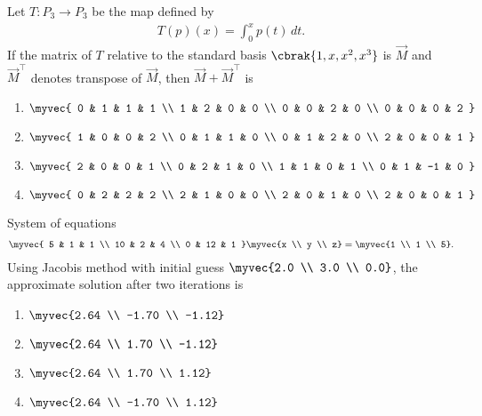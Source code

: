 \item
Let $T: P_3 \to P_3$ be the map defined by
\begin{align*}
    T(p)(x) = \int_0^x p(t) \, dt.
\end{align*}
If the matrix of $T$ relative to the standard basis $\cbrak{1, x, x^2, x^3}$ is $\vec{M}$ and $\vec{M}^{\top}$ denotes transpose of $\vec{M}$, then $\vec{M} + \vec{M}^{\top}$ is
\hfill{}
\begin{multicols}{4}
\begin{enumerate}
\item $\myvec{
0 & 1 & 1 & 1 \\
1 & 2 & 0 & 0 \\
0 & 0 & 2 & 0 \\
0 & 0 & 0 & 2
}$
\item $\myvec{
1 & 0 & 0 & 2 \\
0 & 1 & 1 & 0 \\
0 & 1 & 2 & 0 \\
2 & 0 & 0 & 1
}$
\item $\myvec{
2 & 0 & 0 & 1 \\
0 & 2 & 1 & 0 \\
1 & 1 & 0 & 1 \\
0 & 1 & -1 & 0
}$
\item $\myvec{
0 & 2 & 2 & 2 \\
2 & 1 & 0 & 0 \\
2 & 0 & 1 & 0 \\
2 & 0 & 0 & 1
}$
\end{enumerate}
\end{multicols}
\item
System of equations
\begin{align*}
    \myvec{
5 & 1 & 1 \\
10 & 2 & 4 \\
0 & 12 & 1
}
\myvec{x \\ y \\ z} =
\myvec{1 \\ 1 \\ 5}.
\end{align*}
Using Jacobis method with initial guess $\myvec{2.0 \\ 3.0 \\ 0.0}$, the approximate solution after two iterations is
\hfill{}
\begin{multicols}{4}
\begin{enumerate}
\item $\myvec{2.64 \\ -1.70 \\ -1.12}$
\item $\myvec{2.64 \\ 1.70 \\ -1.12}$
\item $\myvec{2.64 \\ 1.70 \\ 1.12}$
\item $\myvec{2.64 \\ -1.70 \\ 1.12}$
\end{enumerate}
\end{multicols}

